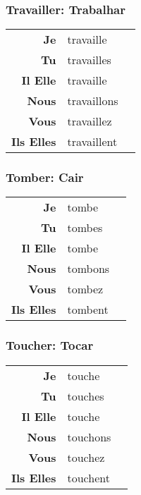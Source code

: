 \documentclass{subfiles}
\begin{document}
\begin{multicols*}{3}
        \subsubsection{Travailler: Trabalhar}
            \begin{tabular}{r l r}
                \textbf{Je}        & travaille   &\\
                \textbf{Tu}        & travailles  &\\
                \textbf{Il Elle}   & travaille   &\\
                \textbf{Nous}      & travaillons &\\
                \textbf{Vous}      & travaillez  &\\
                \textbf{Ils Elles} & travaillent &
            \end{tabular}

        \subsubsection{Tomber: Cair}
            \begin{tabular}{r l r}
                \textbf{Je}        & tombe   &\\
                \textbf{Tu}        & tombes  &\\
                \textbf{Il Elle}   & tombe   &\\
                \textbf{Nous}      & tombons &\\
                \textbf{Vous}      & tombez  &\\
                \textbf{Ils Elles} & tombent &
            \end{tabular}

        \subsubsection{Toucher: Tocar}
            \begin{tabular}{r l r}
                \textbf{Je}        & touche   &\\
                \textbf{Tu}        & touches  &\\
                \textbf{Il Elle}   & touche   &\\
                \textbf{Nous}      & touchons &\\
                \textbf{Vous}      & touchez  &\\
                \textbf{Ils Elles} & touchent &
            \end{tabular}


\end{multicols*}
\end{document}

